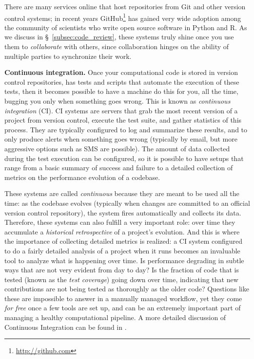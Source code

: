 \documentclass[ChapterTOCs,krantz2]{krantz} %
\newcommand{\blockpar}[1]{\vspace*{3mm} \noindent \textbf{#1}}
\begin{document}
There are many services online that host repositories from Git and other
version control systems; in recent years
GitHub\footnote{\url{http://github.com}} has gained very wide adoption among
the community of scientists who write open source software in Python and R.  As
we discuss in §~\ref{subsec:code_review}, these systems truly shine once you
use them to \emph{collaborate} with others, since collaboration hinges on the
ability of multiple parties to synchronize their work.

\blockpar{Continuous integration.} Once your computational code is stored in
version control repositories, has tests and scripts that automate the
execution of these tests, then it becomes possible to have a machine do
this for you, all the time, bugging you only when something goes wrong.  This
is known as \emph{continuous integration} (CI). CI
systems are servers that grab the most recent version of a project from version
control, execute the test suite, and gather statistics of this process.  They
are typically configured to log and summarize these results, and to only
produce alerts when something goes wrong (typically by email, but more
aggressive options such as SMS are possible).  The amount of data collected
during the test execution can be configured, so it is possible to have setups
that range from a basic summary of success and failure to a detailed collection
of metrics on the performance evolution of a codebase.

These systems are called \emph{continuous} because they are meant to be used
all the time: as the codebase evolves (typically when changes are committed to
an official version control repository), the system fires automatically and
collects its data.  Therefore, these systems can also fulfill a very important
role: over time they accumulate a \emph{historical retrospective} of a
project's evolution.  And this is where the importance of collecting detailed
metrics is realized: a CI system configured to do a fairly detailed analysis of
a project when it runs becomes an invaluable tool to analyze what is happening
over time.  Is performance degrading in subtle ways that are not very evident
from day to day? Is the fraction of code that is tested (known as the
\emph{test coverage}) going down over time, indicating that new contributions
are not being tested as thoroughly as the older code?  Questions like these are
impossible to answer in a manually managed workflow, yet they come \emph{for
free} once a few tools are set up, and can be an extremely important part of
managing a healthy computational pipeline.  A more detailed discussion of
Continuous Integration can be found in \cite{br-ck:2011}.
\end{document}
